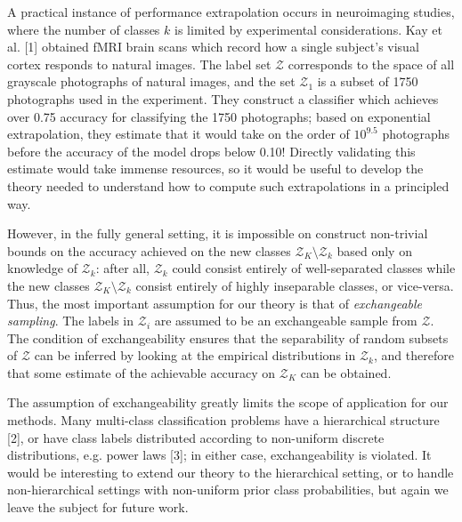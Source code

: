 \documentclass{article}
\begin{document}
A practical instance of performance extrapolation occurs in neuroimaging studies, where the number of classes $k$ is
limited by experimental considerations.
Kay et al. [1] obtained fMRI brain scans which record how a single subject's visual cortex responds to natural images.
The label set $\mathcal{Z}$ corresponds to the space of all grayscale photographs of natural images,
and the set $\mathcal{Z}_1$ is a subset of 1750 photographs used in the experiment.
They construct a classifier which achieves over 0.75 accuracy for classifying the 1750 photographs;
based on exponential extrapolation, they estimate that it would take on the order of $10^{9.5}$ photographs
before the accuracy of the model drops below 0.10!  Directly validating this estimate would take immense resources,
so it would be useful to develop the theory needed to understand how to compute such extrapolations
in a principled way. 

However, in the fully general setting, it is impossible on construct
non-trivial bounds on the accuracy achieved on the new classes $\mathcal{Z}_K \setminus \mathcal{Z}_k$
based only on knowledge of $\mathcal{Z}_k$: after all, $\mathcal{Z}_k$ could consist entirely of well-separated classes
while the new classes $\mathcal{Z}_K \setminus \mathcal{Z}_k$ consist entirely of highly inseparable classes, or vice-versa.
Thus, the most important assumption for our theory is that of \emph{exchangeable sampling}.
The labels in $\mathcal{Z}_i$ are assumed to be an exchangeable sample from $\mathcal{Z}$.
The condition of exchangeability ensures that the separability of random subsets of $\mathcal{Z}$ can be inferred
by looking at the empirical distributions in $\mathcal{Z}_k$, and therefore that some estimate of the achievable
accuracy on $\mathcal{Z}_K$ can be obtained.

The assumption of exchangeability greatly limits the scope of application for our methods.
Many multi-class classification problems
have a hierarchical structure [2], or have class labels distributed according to
non-uniform discrete distributions, e.g. power laws [3]; in either case, exchangeability is violated.
It would be interesting to extend our theory to the hierarchical setting, or to handle non-hierarchical settings
with non-uniform prior class probabilities, but again we leave the subject for future work.
\end{document}
